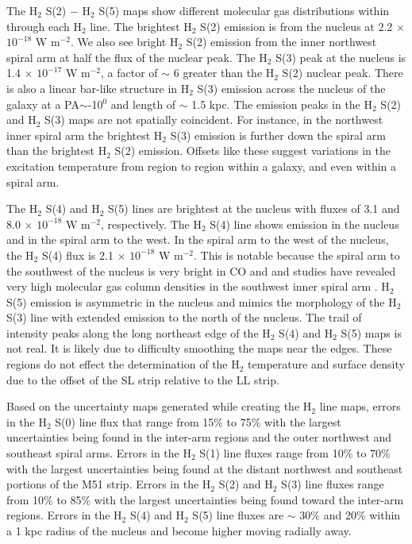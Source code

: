 \documentclass[12pt,preprint]{aastex}
\begin{document}
The $\mathrm{ H_2}$ S(2) $-$ H$_2$ S(5) maps show different
molecular gas distributions within  through each
H$_2$ line.  The brightest H$_2$ S(2) emission is
from the nucleus at 2.2 $\times$ $\mathrm{10^{-18}}$ W
$\mathrm{m^{-2}}$.  We also see bright H$_2$ S(2) emission
from the inner northwest spiral arm at half the flux of the
nuclear peak.  The H$_2$ S(3) peak at the nucleus is 1.4
$\times$ $\mathrm{10^{-17}}$ W $\mathrm{m^{-2}}$, a factor of $\sim$ 6
greater than the H$_2$ S(2) nuclear peak.  There is also a
linear bar-like structure in H$_2$ S(3) emission across the
nucleus of the galaxy at a PA$\sim$-10$^0$ and length of $\sim$ 1.5 kpc. 
The emission peaks in the
H$_2$ S(2) and H$_2$ S(3) maps are not spatially
coincident.  For instance, in the northwest inner spiral arm the brightest
H$_2$ S(3) emission is further down the spiral arm than 
the brightest H$_2$ S(2) emission.  Offsets like
these suggest variations in the excitation temperature from 
region to region within a galaxy, and even within a spiral arm.

The H$_2$ S(4) and H$_2$ S(5) lines are brightest at
the nucleus with fluxes of 3.1 and 8.0 $\times$
$\mathrm{10^{-18}}$ W $\mathrm{m^{-2}}$, respectively.  The H$_2$
S(4) line shows emission in the nucleus and in the spiral arm to the
west.  In the spiral arm to the west of the nucleus, the
H$_2$ S(4) flux is 2.1 $\times$ $\mathrm{10^{-18}}$ W
$\mathrm{m^{-2}}$.  This is notable because the spiral arm to the
southwest of the nucleus is very bright in CO and and studies have
revealed very high molecular gas column densities in the southwest
inner spiral arm \citep{lor90, aal99}.  H$_2$ S(5) emission is
asymmetric in the nucleus and mimics the morphology of the
H$_2$ S(3) line with extended emission to the north of the
nucleus.  The trail of intensity peaks along the long northeast edge
of the H$_2$ S(4) and H$_2$ S(5) maps is not real.  It is likely due to 
difficulty smoothing the maps near the edges.  These regions do 
not effect the determination of the H$_2$ temperature and surface 
density due to the offset of the SL strip relative to the LL strip.

Based on the uncertainty maps generated while creating the H$_2$ line maps, 
errors in the H$_2$ S(0) line flux that range from 15\% to 75\% with the 
largest uncertainties being found in the inter-arm regions and the outer 
northwest and southeast spiral arms.  Errors in the H$_2$ S(1) line 
fluxes range from 10\% to 70\% with the largest uncertainties being 
found at the distant northwest and southeast portions of the M51 strip.  
Errors in the H$_2$ S(2) and H$_2$ S(3) line fluxes range from 10\% 
to 85\% with the largest uncertainties being found toward the inter-arm 
regions.  Errors in the H$_2$ S(4) and H$_2$ S(5) line fluxes are 
$\sim$ 30\% and 20\% within a 1 kpc radius of the nucleus and become higher 
moving radially away. 
\end{document}
